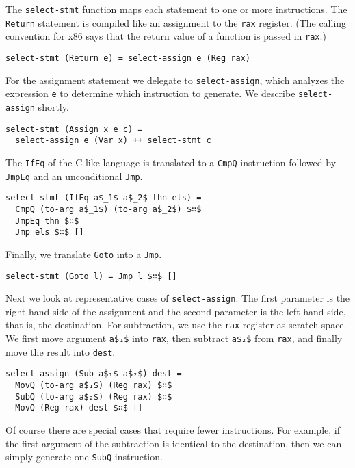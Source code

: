 \documentclass[sigplan,screen]{acmart}
\begin{document}
\noindent The \lstinline{select-stmt} function maps each statement to
one or more instructions. The \lstinline{Return} statement is compiled
like an assignment to the \lstinline{rax} register. (The calling
convention for x86 says that the return value of a function is passed
in \lstinline{rax}.)

\begin{lstlisting}
select-stmt (Return e) = select-assign e (Reg rax)
\end{lstlisting}

\noindent For the assignment statement we delegate to
\lstinline{select-assign}, which analyzes the expression \lstinline{e}
to determine which instruction to generate.  We describe
\lstinline{select-assign} shortly.

\begin{lstlisting}
select-stmt (Assign x e c) =
  select-assign e (Var x) ++ select-stmt c
\end{lstlisting}

\noindent The \lstinline{IfEq} of the C-like language
is translated to a \lstinline{CmpQ} instruction followed
by \lstinline{JmpEq} and an unconditional \lstinline{Jmp}.

\begin{lstlisting}
select-stmt (IfEq a$_1$ a$_2$ thn els) =
  CmpQ (to-arg a$_1$) (to-arg a$_2$) $∷$
  JmpEq thn $∷$
  Jmp els $∷$ []
\end{lstlisting}

\noindent Finally, we translate \lstinline{Goto} into a \lstinline{Jmp}.
\begin{lstlisting}
select-stmt (Goto l) = Jmp l $∷$ [] 
\end{lstlisting}

Next we look at representative cases of \lstinline{select-assign}. The
first parameter is the right-hand side of the assignment and the
second parameter is the left-hand side, that is, the destination. For
subtraction, we use the \lstinline{rax} register as scratch space. We
first move argument \lstinline{a$₁$} into \lstinline{rax}, then
subtract \lstinline{a$₂$} from \lstinline{rax}, and finally move the
result into \lstinline{dest}.

\begin{lstlisting}
select-assign (Sub a$₁$ a$₂$) dest =
  MovQ (to-arg a$₁$) (Reg rax) $∷$
  SubQ (to-arg a$₂$) (Reg rax) $∷$
  MovQ (Reg rax) dest $∷$ []
\end{lstlisting}

\noindent Of course there are special cases that require fewer
instructions. For example, if the first argument of the subtraction is
identical to the destination, then we can simply generate one
\lstinline{SubQ} instruction. 
\end{document}
